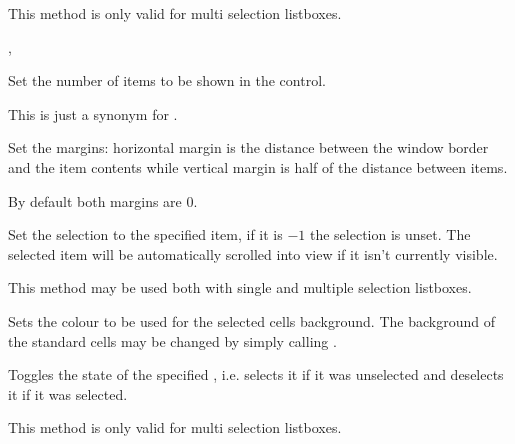 This method is only valid for multi selection listboxes.


, 

\label{wxvlistboxsetitemcount}


Set the number of items to be shown in the control.

This is just a synonym for
.


\label{wxvlistboxsetmargins}



Set the margins: horizontal margin is the distance between the window
border and the item contents while vertical margin is half of the
distance between items.

By default both margins are $0$.


\label{wxvlistboxsetselection}


Set the selection to the specified item, if it is $-1$ the selection is
unset. The selected item will be automatically scrolled into view if it isn't
currently visible.

This method may be used both with single and multiple selection listboxes.


\label{wxvlistboxsetselectionbackground}


Sets the colour to be used for the selected cells background. The background of
the standard cells may be changed by simply calling
.




\label{wxvlistboxtoggle}


Toggles the state of the specified , i.e. selects it if it was
unselected and deselects it if it was selected.

This method is only valid for multi selection listboxes.



